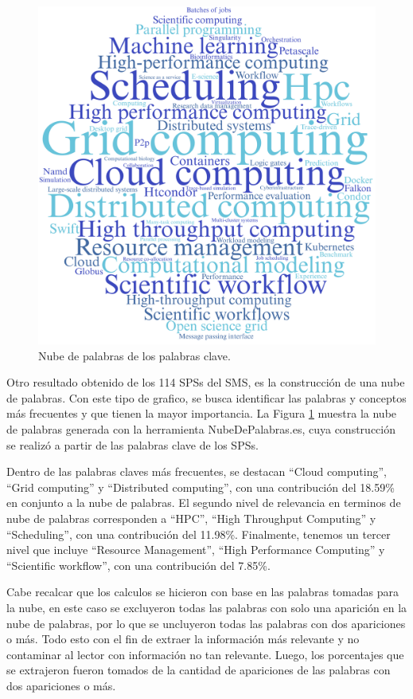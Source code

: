 \begin{figure}[htbp]
	\centering
	\vspace{10pt}
	\includegraphics[scale=0.05]{resources/figures/wordcloud.png}
	\vspace{6pt}
	\caption{Nube de palabras de los palabras clave.}
	\label{fig:WordCloud}
\end{figure}

Otro resultado obtenido de los 114 SPSs del SMS, es la construcción de una nube de palabras. Con este tipo de grafico, se busca identificar las palabras y conceptos más frecuentes y que tienen la mayor importancia. La Figura \ref{fig:WordCloud} muestra la nube de palabras generada con la herramienta NubeDePalabras.es, cuya construcción se realizó a partir de las palabras clave de los SPSs.

Dentro de las palabras claves más frecuentes, se destacan ``Cloud computing'', ``Grid computing'' y ``Distributed computing'', con una contribución del 18.59\% en conjunto a la nube de palabras. El segundo nivel de relevancia en terminos de nube de palabras corresponden a ``HPC'', ``High Throughput Computing'' y ``Scheduling'', con una contribución del 11.98\%. Finalmente, tenemos un tercer nivel que incluye ``Resource Management'', ``High Performance Computing'' y ``Scientific workflow'', con una contribución del 7.85\%.

Cabe recalcar que los calculos se hicieron con base en las palabras tomadas para la nube, en este caso se excluyeron todas las palabras con solo una aparición en la nube de palabras, por lo que se uncluyeron todas las palabras con dos apariciones o más. Todo esto con el fin de extraer la información más relevante y no contaminar al lector con información no tan relevante. Luego, los porcentajes que se extrajeron fueron tomados de la cantidad de apariciones de las palabras con dos apariciones o más.
